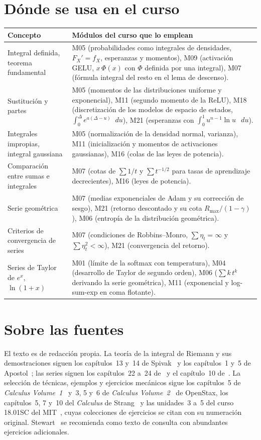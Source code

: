 \documentclass[11pt,a4paper,twoside,openany]{book}
\newcommand{\dif}{\mathop{}\!d}
\begin{document}
\section*{Dónde se usa en el curso}
\begin{center}
\small
\begin{tabularx}{\textwidth}{@{}>{\raggedright\arraybackslash}p{4.6cm}X@{}}
\toprule
Concepto & Módulos del curso que lo emplean \\
\midrule
Integral definida, teorema fundamental & M05 (probabilidades como integrales de densidades, $F_X'=f_X$, esperanzas y momentos), M09 (activación GELU, $x\,\Phi(x)$ con $\Phi$ definida por una integral), M07 (fórmula integral del resto en el lema de descenso). \\
Sustitución y partes & M05 (momentos de las distribuciones uniforme y exponencial), M11 (segundo momento de la ReLU), M18 (discretización de los modelos de espacio de estados, $\int_0^{\Delta}e^{a(\Delta-u)}\dif u$), M21 (esperanzas con $\int_0^1u^{n-1}\ln u\,\dif u$). \\
Integrales impropias, integral gaussiana & M05 (normalización de la densidad normal, varianza), M11 (inicialización y momentos de activaciones gaussianas), M16 (colas de las leyes de potencia). \\
Comparación entre sumas e integrales & M07 (cotas de $\sum 1/t$ y $\sum t^{-1/2}$ para tasas de aprendizaje decrecientes), M16 (leyes de potencia). \\
Serie geométrica & M07 (medias exponenciales de Adam y su corrección de sesgo), M21 (retorno descontado y su cota $R_{\max}/(1-\gamma)$), M06 (entropía de la distribución geométrica). \\
Criterios de convergencia de series & M07 (condiciones de Robbins--Monro, $\sum\eta_t=\infty$ y $\sum\eta_t^{2}<\infty$), M21 (convergencia del retorno). \\
Series de Taylor de $e^{x}$, $\ln(1+x)$ & M01 (límite de la softmax con temperatura), M04 (desarrollo de Taylor de segundo orden), M06 ($\sum k\,t^{k}$ derivando la serie geométrica), M11 (exponencial y log-sum-exp en coma flotante). \\
\bottomrule
\end{tabularx}
\end{center}

\section*{Sobre las fuentes}
El texto es de redacción propia. La teoría de la integral de Riemann y sus demostraciones siguen los capítulos~13 y~14 de Spivak~\cite{spivak} y los capítulos~1 y~5 de Apostol~\cite{apostol}; las series siguen los capítulos~22 a~24 de~\cite{spivak} y el capítulo~10 de~\cite{apostol}. La selección de técnicas, ejemplos y ejercicios mecánicos sigue los capítulos~5 de \emph{Calculus Volume~1}~\cite{openstax1} y~3, 5 y~6 de \emph{Calculus Volume~2}~\cite{openstax2} de OpenStax, los capítulos~5, 7 y~10 del \emph{Calculus} de Strang~\cite{strang} y las unidades~3 a~5 del curso 18.01SC del MIT~\cite{mit1801}, cuyas colecciones de ejercicios se citan con su numeración original. Stewart~\cite{stewart} se recomienda como texto de consulta con abundantes ejercicios adicionales.
\end{document}
